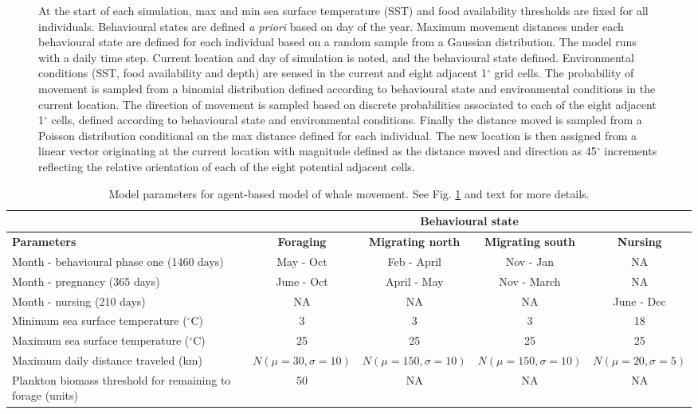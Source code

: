 \documentclass[a4paper,12pt]{article}
\begin{document}
\begin{landscape}
\begin{figure}[!htbp]
{  At the start of each simulation, max and min sea surface temperature (SST) and food availability thresholds are fixed for all individuals. Behavioural states are defined \textit{a priori} based on day of the year. Maximum movement distances under each behavioural state are defined for each individual based on a random sample from a Gaussian distribution. The model runs with a daily time step. Current location and day of simulation is noted, and the behavioural state defined. Environmental conditions (SST, food availability and depth) are sensed in the current and eight adjacent 1$^{\circ}$ grid cells. The probability of movement is sampled from a binomial distribution defined according to behavioural state and environmental conditions in the current location. The direction of movement is sampled based on discrete probabilities associated to each of the eight adjacent 1$^{\circ}$ cells, defined according to behavioural state and environmental conditions. Finally the distance moved is sampled from a Poisson distribution conditional on the max distance defined for each individual. The new location is then assigned from a linear vector originating at the current location with magnitude defined as the distance moved and direction as 45$^{\circ}$ increments reflecting the relative orientation of each of the eight potential adjacent cells.}
  \label{figs5}
\end{figure}

\newpage

\centering
\begin{table}
  \begin{tabular}{|p{5cm}|c|c|c|c|} 
    \hline
    & \multicolumn{4}{|c|}{\textbf{Behavioural state}} \\
    \hline
    \textbf{Parameters} & \textbf{Foraging} & \textbf{Migrating north} & \textbf{Migrating south} & \textbf{Nursing}\\
    \hline
    Month - behavioural phase one (1460 days) & May - Oct & Feb - April & Nov - Jan & NA\\
    \hline
    Month - pregnancy (365 days) & June - Oct & April - May & Nov - March & NA\\
    \hline
    Month - nursing (210 days) & NA & NA & NA & June - Dec\\
    \hline
    Minimum sea surface temperature ($^{\circ}$C) & 3 & 3 & 3 & 18\\
    \hline
    Maximum sea surface temperature ($^{\circ}$C) & 25 & 25 & 25 & 25\\
    \hline
    Maximum daily distance traveled (km) & $N(\mu=30, \sigma=10)$ & $N(\mu=150, \sigma=10)$ & $N(\mu=150, \sigma=10)$ & $N(\mu=20, \sigma=5)$\\
    \hline
    Plankton biomass threshold for remaining to forage (units) & 50 & NA & NA & NA\\
    \hline
  \end{tabular}
  \caption{Model parameters for agent-based model of whale movement. See Fig. \ref{figs5} and text for more details.}
  \label{tables1}
\end{table}

\end{landscape}
 
\newpage


\end{document}

